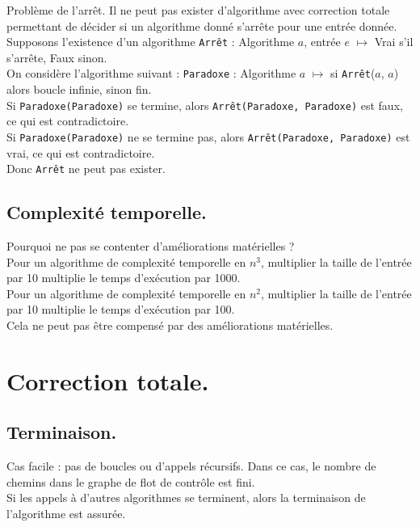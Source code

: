 \documentclass[french, 11pt]{article}
\begin{document}
\begin{thm}{Problème de l'arrêt.}{}
    Il ne peut pas exister d'algorithme avec correction totale permettant de décider si un algorithme donné s'arrête pour une entrée donnée.
    \tcblower
    Supposons l'existence d'un algorithme \texttt{Arrêt} : Algorithme $a$, entrée $e$ $\mapsto$ Vrai s'il s'arrête, Faux sinon.\\
    On considère l'algorithme suivant : \texttt{Paradoxe} : Algorithme $a$ $\mapsto$ si \texttt{Arrêt}($a$, $a$) alors boucle infinie, sinon fin.\\
    Si \texttt{Paradoxe(Paradoxe)} se termine, alors \texttt{Arrêt(Paradoxe, Paradoxe)} est faux, ce qui est contradictoire.\\
    Si \texttt{Paradoxe(Paradoxe)} ne se termine pas, alors \texttt{Arrêt(Paradoxe, Paradoxe)} est vrai, ce qui est contradictoire.\\
    Donc \texttt{Arrêt} ne peut pas exister.
\end{thm}

\subsection{Complexité temporelle.}

\begin{defi}{}{}
    Pourquoi ne pas se contenter d'améliorations matérielles ?\\
    Pour un algorithme de complexité temporelle en $n^3$, multiplier la taille de l'entrée par 10 multiplie le temps d'exécution par 1000.\\
    Pour un algorithme de complexité temporelle en $n^2$, multiplier la taille de l'entrée par 10 multiplie le temps d'exécution par 100.\\
    Cela ne peut pas être compensé par des améliorations matérielles.
\end{defi}

\section{Correction totale.}

\subsection{Terminaison.}

\begin{meth}{Cas facile : pas de boucles ou d'appels récursifs.}{}
    Dans ce cas, le nombre de chemins dans le graphe de flot de contrôle est fini.\\
    Si les appels à d'autres algorithmes se terminent, alors la terminaison de l'algorithme est assurée.
\end{meth}
\end{document}
